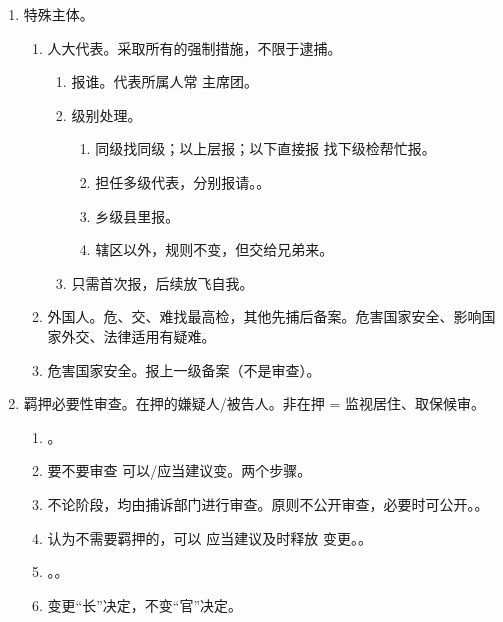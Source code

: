 \begin{enumerate}
\begin{enumerate}
          \item 羁押已超期。
          \item 期限未审结。
        \end{enumerate}
  \item 特殊主体。
        \begin{enumerate}
          \item 人大代表。采取所有的强制措施，不限于逮捕。
                \begin{enumerate}
                  \item 报谁。代表所属人常 \hz 主席团。
                  \item 级别处理。
                        \begin{enumerate}
                          \item 同级找同级；以上层报；以下直接报 \hz 找下级检帮忙报。
                          \item 担任多级代表，分别报请。。
                          \item 乡级县里报。
                          \item 辖区以外，规则不变，但交给兄弟来。
                        \end{enumerate}
                  \item 只需首次报，后续放飞自我。
                \end{enumerate}
          \item 外国人。危、交、难找最高检，其他先捕后备案。危害国家安全、影响国家外交、法律适用有疑难。
          \item 危害国家安全。报上一级备案（不是审查）。
        \end{enumerate}
  \item 羁押必要性审查。在押的嫌疑人/被告人。非在押 = 监视居住、取保候审。
        \begin{enumerate}
          \item {}。
          \item 要不要审查 \yjt 可以/应当建议变。两个步骤。
          \item 不论阶段，均由捕诉部门进行审查。原则不公开审查，必要时可公开。。
          \item 认为不需要羁押的，可以 \hz 应当建议及时释放 \hz 变更。。
          \item {}。。
          \item 变更“长”决定，不变“官”决定。
        \end{enumerate}
\end{enumerate}
